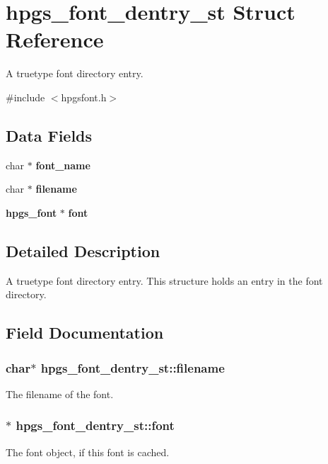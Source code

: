 \section{hpgs\_\-font\_\-dentry\_\-st Struct Reference}
\label{structhpgs__font__dentry__st}


A truetype font directory entry.  




{\ttfamily \#include $<$hpgsfont.h$>$}

\subsection*{Data Fields}
\begin{DoxyCompactItemize}
\item 
char $\ast$ {\bf font\_\-name}
\item 
char $\ast$ {\bf filename}
\item 
{\bf hpgs\_\-font} $\ast$ {\bf font}
\end{DoxyCompactItemize}


\subsection{Detailed Description}
A truetype font directory entry. This structure holds an entry in the font directory. 

\subsection{Field Documentation}
\subsubsection[{filename}]{\setlength{\rightskip}{0pt plus 5cm}char$\ast$ {\bf hpgs\_\-font\_\-dentry\_\-st::filename}}\label{structhpgs__font__dentry__st_ad3400a323f96c389c889691b594209d7}
The filename of the font. 
\subsubsection[{font}]{$\ast$ {\bf hpgs\_\-font\_\-dentry\_\-st::font}}\label{structhpgs__font__dentry__st_aade4b052ab7e8691c324417d120f14b3}
The font object, if this font is cached. 

